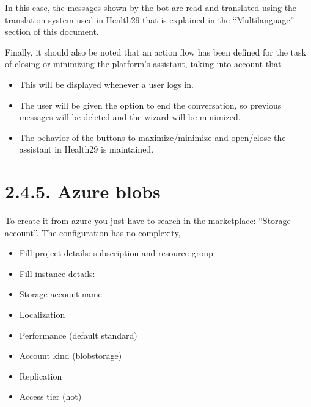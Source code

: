 \documentclass[letterpaper,10pt,english]{sphinxmanual}
\begin{document}
In this case, the messages shown by the bot are read and translated using the translation system used in Health29 that is explained in the “Multilanguage” section of this document.

Finally, it should also be noted that an action flow has been defined for the task of closing or minimizing the platform’s assistant, taking into account that
\begin{itemize}
\item {} 
This will be displayed whenever a user logs in.

\item {} 
The user will be given the option to end the conversation, so previous messages will be deleted and the wizard will be minimized.

\item {} 
The behavior of the buttons to maximize/minimize and open/close the assistant in Health29 is maintained.

\end{itemize}


\section{2.4.5. Azure blobs}
\label{\detokenize{pages/SW/Code:azure-blobs}}
To create it from azure you just have to search in the marketplace: “Storage account”.
The configuration has no complexity,
\begin{itemize}
\item {} 
Fill project details: subscription and resource group

\item {} 
Fill instance details:

\end{itemize}
\begin{itemize}
\item {} 
Storage account name

\item {} 
Localization

\item {} 
Performance (default standard)

\item {} 
Account kind (blobstorage)

\item {} 
Replication

\item {} 
Access tier (hot)

\end{itemize}
\end{document}
